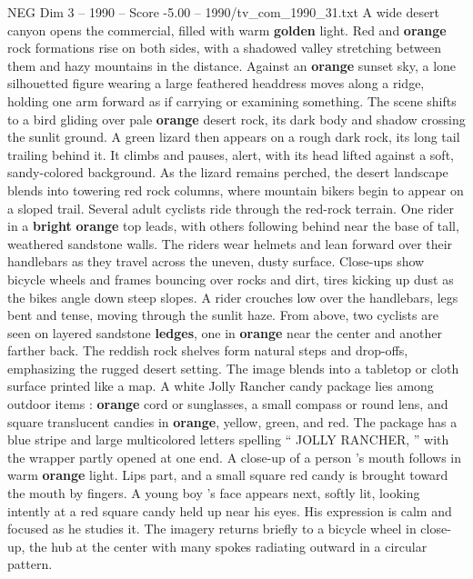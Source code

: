 \begin{textsample}{NEG Dim 3 – 1990 – Score -5.00 – 1990/tv\_com\_1990\_31.txt}  \label{ex:f3_neg_041}
A wide desert canyon opens the commercial, filled with warm \textbf{golden} light.
Red and \textbf{orange} rock formations rise on both sides, with a shadowed valley stretching between them and hazy mountains in the distance.
Against an \textbf{orange} sunset sky, a lone silhouetted figure wearing a large feathered headdress moves along a ridge, holding one arm forward as if carrying or examining something.
The scene shifts to a bird gliding over pale \textbf{orange} desert rock, its dark body and shadow crossing the sunlit ground.
A green lizard then appears on a rough dark rock, its long tail trailing behind it.
It climbs and pauses, alert, with its head lifted against a soft, sandy-colored background.
As the lizard remains perched, the desert landscape blends into towering red rock columns, where mountain bikers begin to appear on a sloped trail.
Several adult cyclists ride through the red-rock terrain.
One rider in a \textbf{bright} \textbf{orange} top leads, with others following behind near the base of tall, weathered sandstone walls.
The riders wear helmets and lean forward over their handlebars as they travel across the uneven, dusty surface.
Close-ups show bicycle wheels and frames bouncing over rocks and dirt, tires kicking up dust as the bikes angle down steep slopes.
A rider crouches low over the handlebars, legs bent and tense, moving through the sunlit haze.
From above, two cyclists are seen on layered sandstone \textbf{ledges}, one in \textbf{orange} near the center and another farther back.
The reddish rock shelves form natural steps and drop-offs, emphasizing the rugged desert setting.
The image blends into a tabletop or cloth surface printed like a map.
A white Jolly Rancher candy package lies among outdoor items : \textbf{orange} cord or sunglasses, a small compass or round lens, and square translucent candies in \textbf{orange}, yellow, green, and red.
The package has a blue stripe and large multicolored letters spelling “ JOLLY RANCHER, ” with the wrapper partly opened at one end.
A close-up of a person ’s mouth follows in warm \textbf{orange} light.
Lips part, and a small square red candy is brought toward the mouth by fingers.
A young boy ’s face appears next, softly lit, looking intently at a red square candy held up near his eyes.
His expression is calm and focused as he studies it.
The imagery returns briefly to a bicycle wheel in close-up, the hub at the center with many spokes radiating outward in a circular pattern.

\end{textsample}
